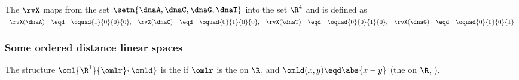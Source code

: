 \begin{definition}
\label{def:rv_dnaR4}
The  $\rvX$ maps from the set $\setn{\dnaA,\dnaC,\dnaG,\dnaT}$ into the set $\R^4$
and is defined as\footnotemark
\\\indentx$\begin{array}{rclrclrclrcl}
     \rvX(\dnaA) &\eqd& \oquad{1}{0}{0}{0}, 
    &\rvX(\dnaC) &\eqd& \oquad{0}{1}{0}{0}, 
    &\rvX(\dnaT) &\eqd& \oquad{0}{0}{1}{0}, 
    &\rvX(\dnaG) &\eqd& \oquad{0}{0}{0}{1}
\end{array}$
\end{definition}


\subsubsection{Some ordered distance linear spaces}
\begin{definition}
\label{def:dieR1oml}
The structure $\oml{\R^1}{\omlr}{\omld}$ is the 
if $\omlr$ is the  on $\R$, 
and $\omld(x,y)\eqd\abs{x-y}$ (the  on $\R$, ).
\end{definition}

